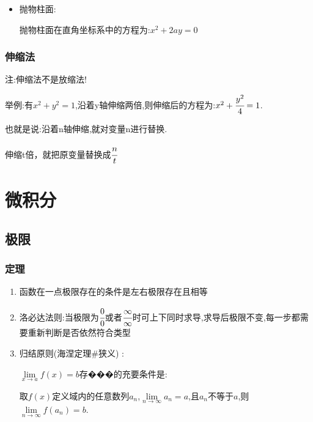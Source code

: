 \documentclass[UTF8,12pt]{ctexbook}
\newcommand{\limNormal}[1]{\lim\limits_{#1}}
\newcommand{\defFunction}[1]{f(#1)}
\begin{document}
{{{{\begin{itemize}
{\begin{itemize}
{                      双曲柱面在直角坐标系中的方程为:$\cfrac{x^2}{a^2} - \cfrac{y^2}{b^2} = 1$
                      }
                \item {
                      抛物柱面:

                      抛物柱面在直角坐标系中的方程为:$x^2 + 2ay = 0$
                      }
              \end{itemize}
              }
      \end{itemize}
    }%

    \subsubsection{伸缩法}{
      注:伸缩法不是放缩法!

      举例:有$x^2 + y^2 = 1$,沿着y轴伸缩两倍,则伸缩后的方程为:$x^2 + \cfrac{y^2}{4} = 1$.

      也就是说:沿着n轴伸缩,就对变量n进行替换.

      伸缩t倍，就把原变量替换成$\cfrac{n}{t}$
    }%
  }%

 }%

\section{微积分}{

\subsection{极限}{

  \subsubsection{定理}{
    \begin{enumerate}
      \item 函数在一点极限存在的条件是左右极限存在且相等
      \item 洛必达法则:当极限为$\cfrac{0}{0}$或者$\cfrac{\infty}{\infty}$时可上下同时求导,求导后极限不变,每一步都需要重新判断是否依然符合类型
      \item {
            归结原则(海涅定理\#狭义) :

            $\limNormal{x \to a}\defFunction{x} = b$存���的充要条件是:

            取$\defFunction{x}$定义域内的任意数列${a_n}$,$\limNormal{n \to \infty}a_n = a$,且$a_n$不等于$a$,则$\limNormal{n \to \infty}\defFunction{a_n} = b$.

}
\end{enumerate}}}}}
\end{document}

